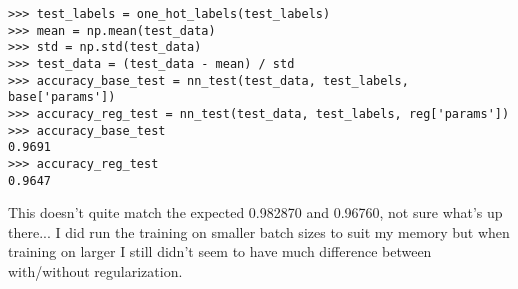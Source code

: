 \begin{answer}
	\begin{verbatim}
>>> test_labels = one_hot_labels(test_labels)
>>> mean = np.mean(test_data)
>>> std = np.std(test_data)
>>> test_data = (test_data - mean) / std
>>> accuracy_base_test = nn_test(test_data, test_labels, base['params'])
>>> accuracy_reg_test = nn_test(test_data, test_labels, reg['params'])
>>> accuracy_base_test
0.9691
>>> accuracy_reg_test
0.9647
\end{verbatim}
This doesn't quite match the expected 0.982870 and 0.96760, not sure what's up there...
I did run the training on smaller batch sizes to suit my memory but when training on larger I still didn't seem to have much difference between with/without regularization.
\end{answer}
   
  
